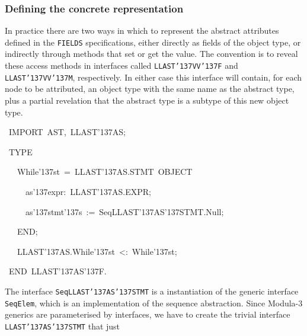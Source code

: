 {{\subsubsection{Defining the concrete representation}
\par
In practice there are two ways in which to represent the abstract
attributes defined in the {\tt FIELDS} specifications, either directly as
fields of the object type, or indirectly through methods that set or
get the value. The convention is to reveal these access methods in
interfaces called {\tt LLAST\char'137{}VV\char'137{}F} and {\tt LLAST\char'137{}VV\char'137{}M}, respectively. In
either case this interface will contain, for each node to be
attributed, an object type with the same name as the abstract type,
plus a partial revelation that the abstract type is a subtype of this
new object type.
\par
\par
\par{}\noindent\par
{\display ~IMPORT~AST,~LLAST\char'137{}AS;}\noindent\par
{\display ~TYPE}\noindent\par
{\display ~~~While\char'137{}st~=~LLAST\char'137{}AS.STMT~OBJECT}\noindent\par
{\display ~~~~~as\char'137{}expr:~LLAST\char'137{}AS.EXPR;}\noindent\par
{\display ~~~~~as\char'137{}stmt\char'137{}s~:=~SeqLLAST\char'137{}AS\char'137{}STMT.Null;}\noindent\par
{\display ~~~END;}\noindent\par
\medskip\noindent%
\par{}\noindent\par
{\display ~~~LLAST\char'137{}AS.While\char'137{}st~<:~While\char'137{}st;}\noindent\par
\medskip\noindent%
\par{}\noindent\par
{\display ~END~LLAST\char'137{}AS\char'137{}F.}\noindent\par
\medskip\noindent%
The interface {\tt SeqLLAST\char'137{}AS\char'137{}STMT} is a instantiation of the generic
interface {\tt SeqElem}, which is an implementation of the sequence
abstraction.  Since Modula-3 generics are parameterised by interfaces,
we have to create the trivial interface {\tt LLAST\char'137{}AS\char'137{}STMT} that just
}}
